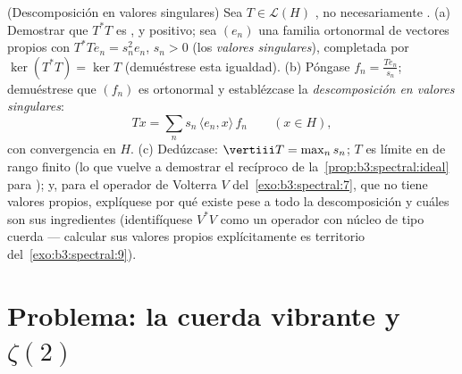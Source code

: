 \begin{exercise}[$\star\star\star$]\label{exo:b3:spectral:12}
(Descomposición en valores singulares) Sea $T \in \mathcal L(H)$
\emph{}, no necesariamente
. (a) Demostrar que
$T^*T$ es ,
 y positivo; sea
$(e_n)$ una familia ortonormal de vectores propios con
$T^*Te_n = s_n^2e_n$, $s_n > 0$ (los \emph{valores singulares}),
completada por $\ker(T^*T) = \ker T$ (demuéstrese esta igualdad). (b)
Póngase $f_n = \frac{Te_n}{s_n}$; demuéstrese que $(f_n)$ es ortonormal
y establézcase la \emph{descomposición en valores singulares}:
\[
Tx = \sum_n s_n\,\langle e_n, x\rangle\,f_n
\qquad (x \in H),
\]
con convergencia en $H$. (c) Dedúzcase: $\vertiii T = \max_ns_n$; $T$ es
límite en  de rango finito (lo que vuelve a demostrar
el recíproco de la~\cref{prop:b3:spectral:ideal} para
); y, para el operador
de Volterra $V$ del~\cref{exo:b3:spectral:7}, que no tiene valores
propios, explíquese por qué existe pese a todo la descomposición y
cuáles son sus ingredientes (identifíquese $V^*V$ como un operador con
núcleo de tipo cuerda --- calcular sus valores propios explícitamente es
territorio del~\cref{exo:b3:spectral:9}).
\end{exercise}

\section{Problema: la cuerda vibrante y
\texorpdfstring{$\zeta(2)$}{zeta(2)}}

